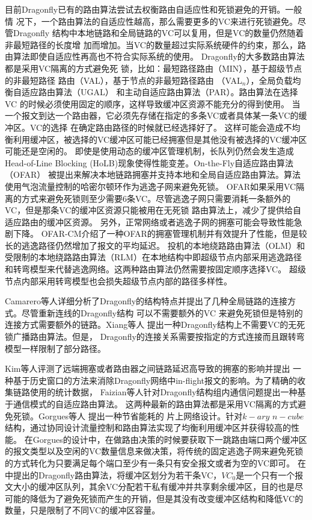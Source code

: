 目前Dragonfly已有的路由算法尝试去权衡路由自适应性和死锁避免的开销。一般情
况下，一个路由算法的自适应性越高，那么需要更多的VC来进行死锁避免。尽管Dragonfly
结构中本地链路和全局链路的VC可以复用，但是VC的数量仍然随着非最短路径的长度增
加而增加。当VC的数量超过实际系统硬件的约束，那么，路由算法即使自适应性再高也不符合实际系统的使用。
Dragonfly的大多数路由算法都是采用VC隔离的方式避免死
锁，比如：最短路径路由（MIN），基于超级节点的非最短路径
路由（VAL），基于节点的非最短路径路由
（VAL$_{n}$），全局负载均衡自适应路由算法（UGAL）
和主动自适应路由算法（PAR）。路由算法在选择VC
的时候必须使用固定的顺序，这样导致缓冲区资源不能充分的得到使用。
当一个报文到达一个路由器，它必须先存储在指定的多条VC或者具体某一条VC的缓冲区。VC的选择
在确定路由路径的时候就已经选择好了。
这样可能会造成不均衡利用缓冲区，被选择的VC缓冲区可能已经拥塞但是其他没有被选择的VC缓冲区可能还是空闲的。
即使是使用动态的缓冲区管理机制，长队列仍然会发生造成Head-of-Line Blocking
(HoLB)现象使得性能变差。On-the-Fly自适应路由算法（OFAR）
被提出来解决本地链路拥塞并支持本地和全局自适应路由算法。算法使用气泡流量控制的哈密尔顿环作为逃逸子网来避免死锁。
OFAR如果采用VC隔离的方式来避免死锁则至少需要6条VC。尽管逃逸子网只需要消耗一条额外的VC，但是那条VC的缓冲区资源只能被用在无死锁
路由算法上，减少了提供给自适应路由的缓冲区资源。
另外，正常网络或者逃逸子网的拥塞可能会导致性能急剧下降。
OFAR-CM介绍了一种OFAR的拥塞管理机制并有效提升了性能，但是较长的逃逸路径仍然增加了报文的平均延迟。
投机的本地绕路路由算法（OLM）和受限制的本地绕路路由算法（RLM）在本地结构中即超级节点内部采用逃逸路径
和转弯模型来代替逃逸网络。这两种路由算法仍然需要按固定顺序选择VC。
超级节点内部采用转弯模型也会损失超级节点内部的路径多样性。

Camarero等人详细分析了Dragonfly的结构特点并提出了几种全局链路的连接方式。尽管重新连线的Dragonfly结构
可以不需要额外的VC
来避免死锁但是特别的连接方式需要额外的链路。Xiang等人 提出一种Dragonfly结构上不需要VC的无死锁广播路由算法。但是，
Dragonfly的连接关系需要按指定的方式连接而且跟转弯模型一样限制了部分路径。

Kim等人评测了远端拥塞或者路由器之间链路延迟高导致的拥塞的影响并提出
一种基于历史窗口的方法来消除Dragonfly网络中in-flight报文的影响。为了精确的收集链路使用的统计数据，
Faizian等人针对Dragonfly结构组内通信问题提出一种基于通信模式的自适应路由算法。
这两种最新的路由算法都是采用VC隔离的方式避免死锁。Gorgues等人
提出一种节省能耗的
片上网络设计。针对$k-ary$ $n-cube$结构，通过协同设计流量控制和路由算法实现了均衡利用缓冲区并获得较高的性能。
在Gorgues的设计中，在做路由决策的时候要获取下一跳路由端口两个缓冲区的报文类型以及空闲的VC数量信息来做决策，将传统的固定逃逸子网来避免死锁的方式转化为只要满足每个端口至少有一条只有安全报文或者为空的VC即可。
在中提出的Dragonfly路由算法，将缓冲区划分为若干条VC，$VC_{0}$是一个只有一个报文大小的缓冲区队列，其余VC分配若干私有缓冲并共享剩余缓冲区，目的也是尽可能的降低为了避免死锁而产生的开销，但是其没有改变缓冲区结构和降低VC的数量，只是限制了不同VC的缓冲区容量。

